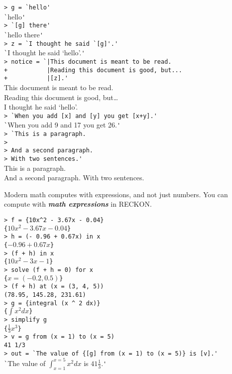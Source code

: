 \documentclass[12pt]{article}
\newcommand{\skey}[2]{{\bf \em #1#2}\index{#1}}
\newenvironment{indpar}[1][0.3in]%
	{\begin{list}{}%
		     {\setlength{\itemsep}{0in}%
		      \setlength{\topsep}{0in}%
		      \setlength{\parsep}{1ex}%
		      \setlength{\labelwidth}{#1}%
		      \setlength{\leftmargin}{#1}%
		      \addtolength{\leftmargin}{\labelsep}}%
	 \item}%
	{\end{list}}
\begin{document}
\begin{indpar}
\verb|> g = `hello'| \\
\verb|`|hello\verb|'| \\
\verb|> `[g] there'| \\
\verb|`|hello there\verb|'| \\
\verb|> z = `I thought he said `[g]'.'| \\
\verb|`|I thought he said `hello'.\verb|'| \\
\verb/> notice = `|This document is meant to be read./ \\
\verb/+           |Reading this document is good, but.../ \\
\verb/+           |[z].'/ \\
This document is meant to be read. \\
Reading this document is good, but\ldots \\
I thought he said `hello'. \\
\verb|> `When you add [x] and [y] you get [x+y].'| \\
\verb|`|When you add 9 and 17 you get 26.\verb|'| \\
\verb|> `This is a paragraph.| \\
\verb|> | \\
\verb|> And a second paragraph.| \\
\verb|> With two sentences.'| \\
This is a paragraph. \\[2ex]
And a second paragraph. With two sentences.
\end{indpar}

Modern math computes with expressions, and not just numbers.
You can compute with \skey{math expression}s in RECKON.

\begin{indpar}
\verb|> f = {10x^2 - 3.67x - 0.04}| \\
\verb|{|$10x^2-3.67x-0.04$\verb|}| \\
\verb|> h = (- 0.96 + 0.67x) in x| \\
\verb|{|$-0.96+0.67x$\verb|}| \\
\verb|> (f + h) in x| \\
\verb|{|$10x^2-3x-1$\verb|}| \\
\verb|> solve (f + h = 0) for x| \\
\verb|{|$x = (-0.2, 0.5)$\verb|}| \\
\verb|> (f + h) at (x = (3, 4, 5))| \\
\verb|(78.95, 145.28, 231.61)| \\
\verb|> g = {integral (x ^ 2 dx)}| \\
\verb|{|$\int x^2 dx$\verb|}| \\
\verb|> simplify g| \\
\verb|{|$\frac{1}{3} x^3$\verb|}| \\
\verb|> v = g from (x = 1) to (x = 5)| \\
\verb|41 1/3| \\
\verb|> out = `The value of {[g] from (x = 1) to (x = 5)} is [v].'| \\
\verb|`|The value of $\int_{x = 1}^{x = 5} x^2 dx$ is $41\frac{1}{3}$.\verb|'|
\end{indpar}
\end{document}
